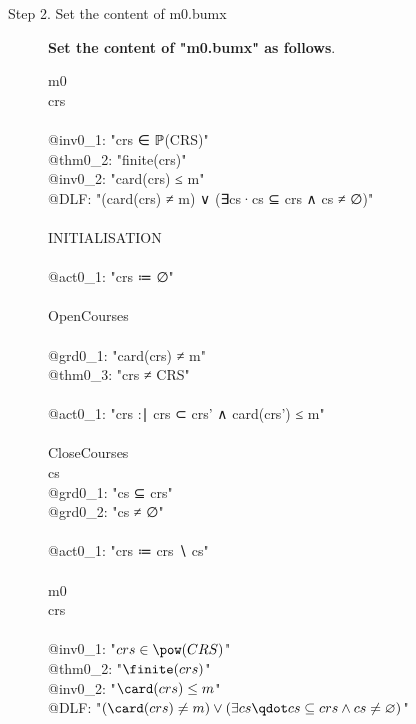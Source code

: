 \begin{description}
\item[Step 2. Set the content of m0.bumx] \textbf{Set the content of "m0.bumx" as follows}.
  \begin{center}
    \begin{Bcode}
      \ifplastex
      \Bmachine{} m0 \\
      \Bvariables{} crs \\
      \Binvariants \\
      @inv0_1: "crs ∈ ℙ(CRS)"\\
      @thm0_2: "finite(crs)" \Btheorem \\
      @inv0_2: "card(crs) ≤ m" \\
      @DLF: "(card(crs) ≠ m) ∨ (∃cs·cs ⊆ crs ∧ cs ≠ ∅)" \\
      \Bevents\\
      INITIALISATION\\
      \Bbegin \\
      @act0_1: "crs ≔ ∅"\\
      \Bend\\
      OpenCourses\\
      \Bwhen\\
      @grd0_1: "card(crs) ≠ m" \\
      @thm0_3: "crs ≠ CRS" \Btheorem \\
      \Bthen\\
      @act0_1: "crs :∣ crs ⊂ crs' ∧ card(crs') ≤ m"\\
      \Bend\\
      CloseCourses \Banticipated\\
      \Bany{} cs \Bwhere\\
      @grd0_1: "cs ⊆ crs"\\
      @grd0_2: "cs ≠ ∅"\\
      \Bthen\\
      @act0_1: "crs ≔ crs ∖ cs"\\
      \Bend\\
      \Bend
      \else
      \Bmachine{} m0 \\
      \Bvariables{} crs \\
      \Binvariants \\
      \Btab @inv0\_1: "\(crs \in \pow(CRS)\)"\\
      \Btab @thm0\_2: "\(\finite(crs)\)" \Btheorem \\
      \Btab @inv0\_2: "\(\card(crs) \leq m\)" \\
      \Btab @DLF: "\((\card(crs) \neq m) \lor (\exists cs \qdot cs \subseteq crs \land cs \neq \emptyset)\)" \\

\end{Bcode}
\end{center}
\end{description}
